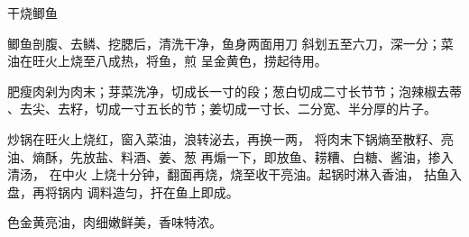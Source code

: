 \begin{recipe}{干烧鲫鱼}

\ingredients


\preparation

\step 鲫鱼剖腹、去鳞、挖腮后，清洗干净，鱼身两面用刀 斜划五至六刀，深一分；菜
油在旺火上烧至八成热，将鱼，煎 呈金黄色，捞起待用。

\step 肥瘦肉剁为肉末；芽菜洗净，切成长一寸的段；葱白切成二寸长节节；泡辣椒去蒂
、去尖、去籽，切成一寸五长的节；姜切成一寸长、二分宽、半分厚的片子。

\step 炒锅在旺火上烧红，窗入菜油，浪转泌去，再换一两， 将肉末下锅熵至散籽、亮
油、熵酥，先放盐、料酒、姜、葱 再煽一下，即放鱼、耢糟、白糖、酱油，掺入清汤，
在中火 上烧十分钟，翻面再烧，烧至收干亮油。起锅时淋入香油， 拈鱼入盘，再将锅内
调料造匀，扞在鱼上即成。

\features

色金黄亮油，肉细嫩鲜美，香味特浓。

\end{recipe}

